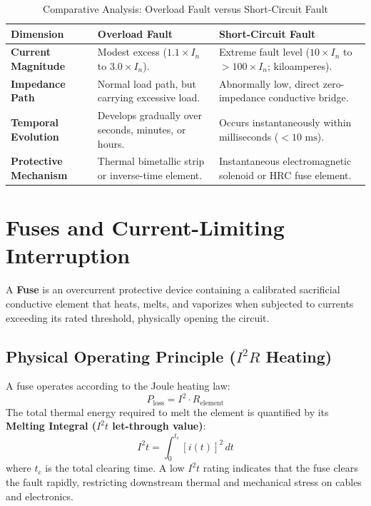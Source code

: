 \begin{table}[htbp]
\centering
\small
\caption{Comparative Analysis: Overload Fault versus Short-Circuit Fault}
\label{tab:overload_vs_shortcircuit}
\begin{tabularx}{\textwidth}{l X X}
\toprule
\textbf{Dimension} & \textbf{Overload Fault} & \textbf{Short-Circuit Fault} \\
\midrule
\textbf{Current Magnitude} & Modest excess ($1.1 \times I_n$ to $3.0 \times I_n$). & Extreme fault level ($10 \times I_n$ to $>100 \times I_n$; kiloamperes). \\
\textbf{Impedance Path} & Normal load path, but carrying excessive load. & Abnormally low, direct zero-impedance conductive bridge. \\
\textbf{Temporal Evolution} & Develops gradually over seconds, minutes, or hours. & Occurs instantaneously within milliseconds ($<10\text{ ms}$). \\
\textbf{Protective Mechanism} & Thermal bimetallic strip or inverse-time element. & Instantaneous electromagnetic solenoid or HRC fuse element. \\
\bottomrule
\end{tabularx}
\end{table}


\section{Fuses and Current-Limiting Interruption}
\label{sec:fuses}

A \textbf{Fuse} is an overcurrent protective device containing a calibrated sacrificial conductive element that heats, melts, and vaporizes when subjected to currents exceeding its rated threshold, physically opening the circuit.

\subsection{Physical Operating Principle ($I^2R$ Heating)}
A fuse operates according to the Joule heating law:
\begin{equation}
\label{eq:fuse_heating}
P_{\text{loss}} = I^2 \cdot R_{\text{element}}
\end{equation}
The total thermal energy required to melt the element is quantified by its \textbf{Melting Integral ($I^2t$ let-through value)}:
\begin{equation}
\label{eq:i2t_rating}
\boxed{I^2t = \int_{0}^{t_c} [i(t)]^2\,dt}
\end{equation}
where $t_c$ is the total clearing time. A low $I^2t$ rating indicates that the fuse clears the fault rapidly, restricting downstream thermal and mechanical stress on cables and electronics.

